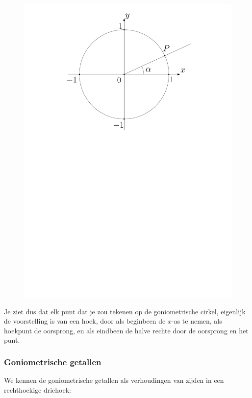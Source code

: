\begin{figure}[h]
\begin{center}
\includegraphics[scale=0.4]{3_gonio_complexe_getallen/inputs/goncirkelhoek.pdf}
\end{center}
\end{figure}

Je ziet dus dat elk punt dat je zou tekenen op de goniometrische cirkel, eigenlijk de voorstelling is van een hoek, door als beginbeen de $x$-as te nemen, als hoekpunt de oorsprong, en als eindbeen de halve rechte door de oorsprong en het punt.

\subsubsection{Goniometrische getallen}

We kennen de goniometrische getallen als verhoudingen van zijden in een rechthoekige driehoek:


